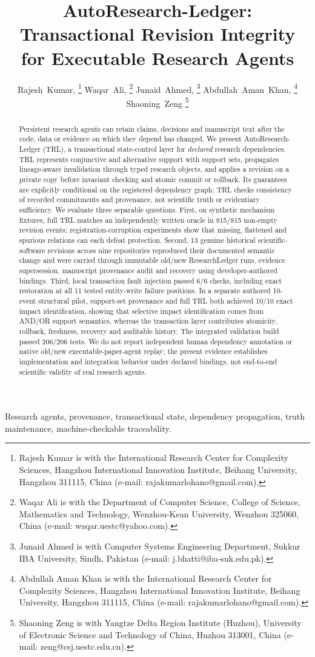 \documentclass[journal]{IEEEtran}
\title{AutoResearch-Ledger: Transactional Revision Integrity for Executable Research Agents}
\author{
    Rajesh~Kumar, %
    \thanks{Rajesh Kumar is with the International Research Center for Complexity Sciences, Hangzhou International Innovation Institute, Beihang University, Hangzhou 311115, China (e-mail: rajakumarlohano@gmail.com).}%
    Waqar~Ali, %
    \thanks{Waqar Ali is with the Department of Computer Science, College of Science, Mathematics and Technology, Wenzhou-Kean University, Wenzhou 325060, China (e-mail: waqar.uestc@yahoo.com).}%
    Junaid~Ahmed, %
    \thanks{Junaid Ahmed is with Computer Systems Engineering Department, Sukkur IBA University, Sindh, Pakistan (e-mail: j.bhatti@iba-suk.edu.pk).}%
    Abdullah~Aman~Khan, %
    \thanks{Abdullah Aman Khan is with the International Research Center for Complexity Sciences, Hangzhou International Innovation Institute, Beihang University, Hangzhou 311115, China (e-mail: rajakumarlohano@gmail.com).}%
    Shaoning~Zeng %
    \thanks{Shaoning Zeng is with Yangtze Delta Region Institute (Huzhou), University of Electronic Science and Technology of China, Huzhou 313001, China (e-mail: zeng@csj.uestc.edu.cn).}%
}
\begin{document}
\maketitle

\begin{abstract}
Persistent research agents can retain claims, decisions and manuscript text after the code, data or evidence on which they depend has changed. We present AutoResearch-Ledger (TRL), a transactional state-control layer for \emph{declared} research dependencies. TRL represents conjunctive and alternative support with support sets, propagates lineage-aware invalidation through typed research objects, and applies a revision on a private copy before invariant checking and atomic commit or rollback. Its guarantees are explicitly conditional on the registered dependency graph: TRL checks consistency of recorded commitments and provenance, not scientific truth or evidentiary sufficiency. We evaluate three separable questions. First, on synthetic mechanism fixtures, full TRL matches an independently written oracle in 815/815 non-empty revision events; registration-corruption experiments show that missing, flattened and spurious relations can each defeat protection. Second, 13 genuine historical scientific-software revisions across nine repositories reproduced their documented semantic change and were carried through immutable old/new ResearchLedger runs, evidence supersession, manuscript provenance audit and recovery using developer-authored bindings. Third, local transaction fault injection passed 6/6 checks, including exact restoration at all 11 tested entity-write failure positions. In a separate authored 10-event structural pilot, support-set provenance and full TRL both achieved 10/10 exact impact identification, showing that selective impact identification comes from AND/OR support semantics, whereas the transaction layer contributes atomicity, rollback, freshness, recovery and auditable history. The integrated validation build passed 206/206 tests. We do not report independent human dependency annotation or native old/new executable-paper-agent replay; the present evidence establishes implementation and integration behavior under declared bindings, not end-to-end scientific validity of real research agents.
\end{abstract}

\begin{IEEEkeywords}
Research agents, provenance, transactional state, dependency propagation, truth maintenance, machine-checkable traceability.
\end{IEEEkeywords}
\end{document}
